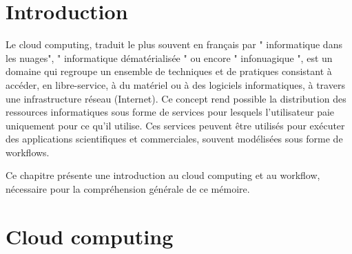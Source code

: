  	 \section{Introduction}
 	  

    Le cloud computing, traduit le plus souvent en français par " informatique dans les nuages", " informatique dématérialisée " ou encore " infonuagique ", est un domaine qui regroupe un ensemble de techniques et de pratiques consistant à accéder, en libre-service, à du matériel ou à des logiciels informatiques, à travers une infrastructure réseau (Internet). Ce concept rend possible la distribution des ressources informatiques sous forme de services pour lesquels l'utilisateur paie uniquement pour ce qu'il utilise. Ces services peuvent être utilisés pour exécuter des applications scientifiques et commerciales, souvent modélisées sous forme de workflows.
    
     
    Ce chapitre présente une introduction au cloud computing et au workflow, nécessaire pour la compréhension générale de ce mémoire.
   
   
    \section{Cloud computing}
